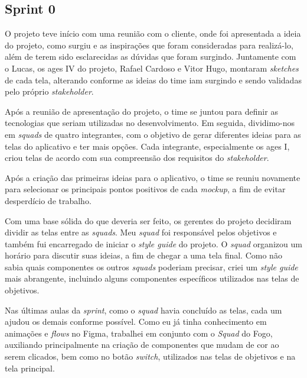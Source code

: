 \subsection{Sprint 0}

O projeto teve início com uma reunião com o cliente, onde foi apresentada a ideia do projeto, como surgiu e as inspirações que foram consideradas para realizá-lo, além de terem sido esclarecidas as dúvidas que foram surgindo. Juntamente com o Lucas, os \ac{ages} IV do projeto, Rafael Cardoso e Vitor Hugo, montaram \textit{sketches} de cada tela, alterando conforme as ideias do time iam surgindo e sendo validadas pelo próprio \textit{stakeholder}.

Após a reunião de apresentação do projeto, o time se juntou para definir as tecnologias que seriam utilizadas no desenvolvimento. Em seguida, dividimo-nos em \textit{squads} de quatro integrantes, com o objetivo de gerar diferentes ideias para as telas do aplicativo e ter mais opções. Cada integrante, especialmente os \ac{ages} I, criou telas de acordo com sua compreensão dos requisitos do \textit{stakeholder}.

Após a criação das primeiras ideias para o aplicativo, o time se reuniu novamente para selecionar os principais pontos positivos de cada \textit{mockup}, a fim de evitar desperdício de trabalho.

Com uma base sólida do que deveria ser feito, os gerentes do projeto decidiram dividir as telas entre as \textit{squads}. Meu \textit{squad} foi responsável pelos objetivos e também fui encarregado de iniciar o \textit{style guide} do projeto. O \textit{squad} organizou um horário para discutir suas ideias, a fim de chegar a uma tela final. Como não sabia quais componentes os outros \textit{squads} poderiam precisar, criei um \textit{style guide} mais abrangente, incluindo alguns componentes específicos utilizados nas telas de objetivos.

Nas últimas aulas da \textit{sprint}, como o \textit{squad} havia concluído as telas, cada um ajudou os demais conforme possível. Como eu já tinha conhecimento em animações e \textit{flows} no Figma, trabalhei em conjunto com o \textit{Squad} do Fogo, auxiliando principalmente na criação de componentes que mudam de cor ao serem clicados, bem como no botão \textit{switch}, utilizados nas telas de objetivos e na tela principal.